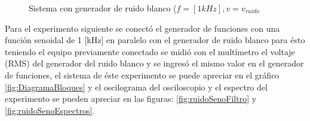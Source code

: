 \documentclass{article}
\begin{document}


\begin{figure}[h!]
    \centering
    \caption{Sistema con generador de ruido blanco ($f=[1kHz],v=v_{ruido}$}
    \label{fig:sistRuidoBlanco}
\end{figure}


Para el experimento siguiente se conectó el generador de funciones con una función senoidal de 1 [kHz] en paralelo con el generador de ruido blanco para ésto teniendo el equipo previamente conectado se midió con el multímetro el voltaje (RMS) del generador del ruido blanco y se ingresó el mismo valor en el generador de funciones, el sistema de éste experimento se puede apreciar en el gráfico \ref{fig:DiagramaBloques} y el oscilograma del osciloscopio y el espectro del experimento se pueden apreciar en  las figuras: \ref{fig:ruidoSenoFiltro} y \ref{fig:ruidoSenoEspectros}.\\

   
\end{document}
